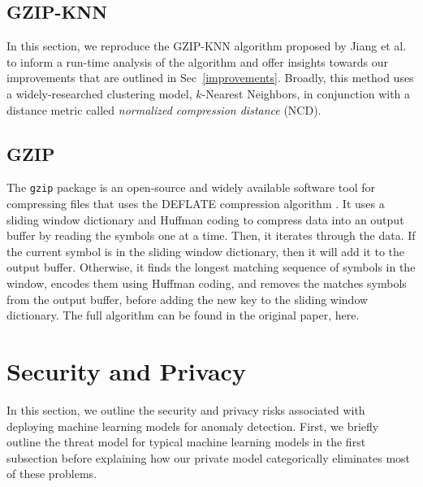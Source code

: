 \documentclass[sigconf]{acmart}
\begin{document}
\subsection{GZIP-KNN}
In this section, we reproduce the GZIP-KNN algorithm proposed by Jiang et al. to inform a run-time analysis of the algorithm and offer insights towards our  improvements that are outlined in Sec~\ref{improvements}. Broadly, this method uses a widely-researched clustering model, $k$-Nearest Neighbors, in conjunction with a  distance metric called \textit{normalized compression distance} (NCD). 


\subsection{GZIP}
    The \texttt{gzip} package is an open-source and widely available software tool for compressing files \cite{gzip} that uses the DEFLATE compression algorithm \cite{deflate}. It uses a sliding window dictionary and Huffman coding \cite{} to compress data into an output buffer by reading the symbols one at a time. Then, it iterates through the data. If the current symbol is in the sliding window dictionary, then it will add it to the output buffer. Otherwise, it finds the longest matching sequence of symbols in the window, encodes them using Huffman coding, and removes the matches symbols from the output buffer, before adding the new key to the sliding window dictionary. The full algorithm can be found in the original paper, here\cite{deflate}.


\section{Security and Privacy}
\label{security}
In this section, we outline the security and privacy risks associated with deploying machine learning models for anomaly detection. First, we briefly outline the threat model for typical machine learning models in the first subsection before explaining how our private model categorically eliminates most of these problems. 
\end{document}
